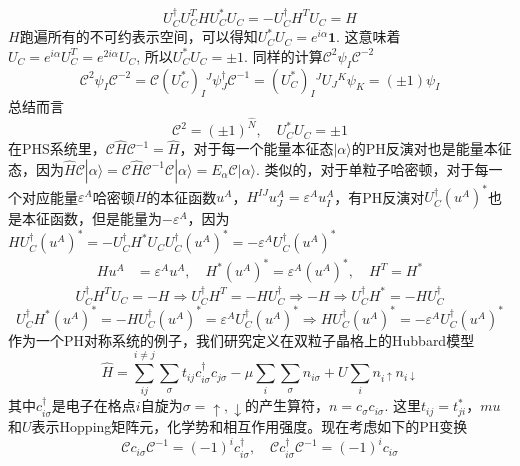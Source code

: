\documentclass{article}
\numberwithin{equation}{subsection}
\newcommand{\mC}{\mathcal{C}}
\begin{document}
\begin{equation}
    U_C^\dagger U_C^THU_C^*U_C=-U_C^\dagger H^TU_C=H
\end{equation}
$H$跑遍所有的不可约表示空间，可以得知$U_C^*U_C=e^{i\alpha}\mathbf{1}$. 这意味着$U_C=e^{i\alpha}U_C^T=e^{2i\alpha}U_C$, 所以$U_C^*U_C=\pm 1$. 同样的计算$\mC^2\psi_I\mC^{-2}$
\begin{equation}
    \mC^2\psi_I\mC^{-2}=\mC (U_C^*)_I{}^J\psi_J^\dagger\mC^{-1}=(U_C^*)_I{}^JU_J{}^K\psi_K=(\pm 1)\psi_I
\end{equation}
总结而言
\begin{equation}
    \mC^2=(\pm 1)^{\hat{N}},\quad U_C^*U_C=\pm 1
\end{equation}
在PHS系统里，$\mC \hat{H}\mC^{-1}=\hat{H}$，对于每一个能量本征态$|\alpha\rangle$的PH反演对也是能量本征态，因为$\hat{H}\mC|\alpha\rangle=\mC \hat{H}\mC^{-1}\mC|\alpha\rangle=E_\alpha\mC|\alpha\rangle$. 类似的，对于单粒子哈密顿，对于每一个对应能量$\varepsilon^A$哈密顿$H$的本征函数$u^A$，$H^{IJ}u^A_J=\varepsilon^A u_{I}^{A}$，有PH反演对$U_C^\dagger (u^A)^*$也是本征函数，但是能量为$-\varepsilon^A$，因为$HU_C^\dagger(u^A)^*=-U_C^\dagger H^*U_CU_C^\dagger (u^A)^*=-\varepsilon^AU_C^\dagger(u^A)^*$
\begin{equation}
    \begin{split}
        Hu^A&=\varepsilon^Au^A,\quad H^*(u^A)^*=\varepsilon^A (u^A)^*,\quad H^T=H^*
    \end{split}
\end{equation}
\begin{equation}
    U_C^\dagger H^TU_C=-H\Rightarrow U_C^\dagger H^T=-HU_C^\dagger\Rightarrow-H\Rightarrow U_C^\dagger H^*=-HU_C^\dagger
\end{equation}
\begin{equation}
    U_C^\dagger H^*(u^A)^*=-HU_C^\dagger (u^A)^*=\varepsilon^A U_C^\dagger(u^A)^*\Rightarrow HU_C^\dagger (u^A)^*=-\varepsilon^AU_C^\dagger(u^A)^*
\end{equation}
作为一个PH对称系统的例子，我们研究定义在双粒子晶格上的Hubbard模型
\begin{equation}
    \hat{H}=\sum_{ij}^{i\neq j}\sum_{\sigma}t_{ij}c_{i\sigma}^\dagger c_{j\sigma}-\mu\sum_{i}\sum_{\sigma}n_{i\sigma}+U\sum_{i}n_{i\uparrow}n_{i\downarrow}
\end{equation}
其中$c_{i\sigma}^\dagger$是电子在格点$i$自旋为$\sigma=\uparrow,\downarrow$的产生算符，$n=c_{\sigma}c_{i\sigma}$. 这里$t_{ij}=t_{ji}^*$，$mu$和$U$表示Hopping矩阵元，化学势和相互作用强度。现在考虑如下的PH变换
\begin{equation}
    \mC c_{i\sigma}\mC^{-1}=(-1)^{i}c_{i\sigma}^\dagger,\quad \mC c_{i\sigma}^\dagger\mC^{-1}=(-1)^{i}c_{i\sigma}
\end{equation}
\end{document}
